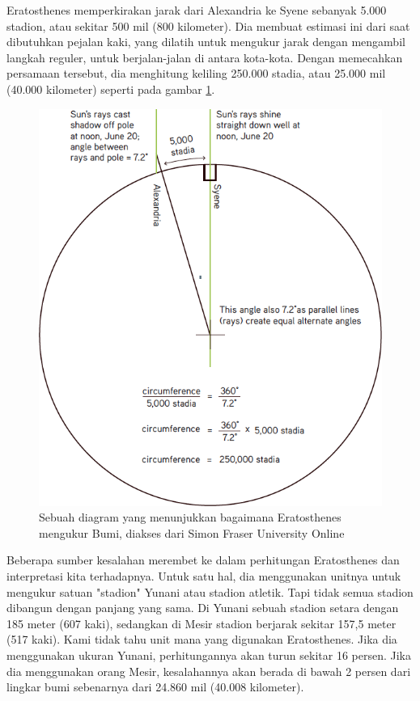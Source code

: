 Eratosthenes memperkirakan jarak dari Alexandria ke Syene sebanyak 5.000 stadion, atau sekitar 500 mil (800 kilometer). Dia membuat estimasi ini dari saat dibutuhkan pejalan kaki, yang dilatih untuk mengukur jarak dengan mengambil langkah reguler, untuk berjalan-jalan di antara kota-kota. Dengan memecahkan persamaan tersebut, dia menghitung keliling 250.000 stadia, atau 25.000 mil (40.000 kilometer) seperti pada gambar \ref{diagram pengukuran bumi}.
\begin{figure}[ht]
	\centerline{\includegraphics[width=1\textwidth]{figures/diagram pengukuran bumi.png}}
	\caption{Sebuah diagram yang menunjukkan bagaimana Eratosthenes mengukur Bumi, diakses dari Simon Fraser University Online}
	\label{diagram pengukuran bumi}
	\end{figure}
Beberapa sumber kesalahan merembet ke dalam perhitungan Eratosthenes dan interpretasi kita terhadapnya. Untuk satu hal, dia menggunakan unitnya untuk mengukur satuan "stadion" Yunani atau stadion atletik. Tapi tidak semua stadion dibangun dengan panjang yang sama. Di Yunani sebuah stadion setara dengan 185 meter (607 kaki), sedangkan di Mesir stadion berjarak sekitar 157,5 meter (517 kaki). Kami tidak tahu unit mana yang digunakan Eratosthenes. Jika dia menggunakan ukuran Yunani, perhitungannya akan turun sekitar 16 persen. Jika dia menggunakan orang Mesir, kesalahannya akan berada di bawah 2 persen dari lingkar bumi sebenarnya dari 24.860 mil (40.008 kilometer).
